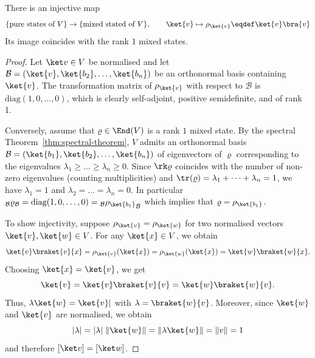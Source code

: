 \documentclass[a4paper,oneside, 12pt]{amsart}
\begin{document}
\begin{proposition}\label{prop:density-matrix-perspective}
  There is an injective map
  \begin{equation}
    \{\text{pure states of }V\}\to\{ \text{mixed stated of } V\}, \qquad \ket{v} \mapsto \rho_{\ket{v}} \eqdef \ket{v}\bra{v}
  \end{equation}
  Its image coincides with the rank \(1\) mixed states.
\end{proposition}
\begin{proof}
  Let \(\ket v \in V\) be normalised and let \( \mathcal{B} = (\ket{v}, \ket{b_2}, \dots, \ket{b_n}) \) be an orthonormal basis containing \( \ket{v} \).
  The transformation matrix of \( \rho_{\ket{v}} \) with respect to \( \mathcal{B} \) is \( \mathrm{diag}(1, 0, \dots, 0)\), which is clearly self-adjoint, positive semidefinite, and of rank 1.

  Conversely, assume that \(\varrho \in \End(V)\) is a rank \(1\) mixed state.
  By the spectral Theorem~\ref{thm:spectral-theorem}, \(V\) admits an orthonormal basis \(\mathcal{B}= (\ket{b_{1}}, \ket{b_{2}}, \dots , \ket{b_{n}})\) of eigenvectors of \(\varrho\) corresponding to the eigenvalues \(\lambda_{1}\geq  \dots \geq \lambda_{n} \geq 0\).
  Since \(\rk \varrho\) coincides with the number of non-zero eigenvalues (counting multiplicities) and \(\tr(\varrho) = \lambda_{1} + \dots + \lambda_{n} = 1\), we have \(\lambda_{1} = 1\) and \(\lambda_{2} = \dots = \lambda_{n} = 0\).
  In particular \(_{\mathcal{B}}\varrho_{\mathcal{B}} = \mathrm{diag}(1,0, \dots , 0) = {}_{\mathcal{B}}{\rho_{\ket{b_{1}}}}_{\mathcal{B}}\) which implies that \(\varrho = \rho_{\ket{b_{1}}}\).


  To show injectivity, suppose \( \rho_{\ket{v}} = \rho_{\ket{w}} \) for two normalised vectors \(\ket{v}, \ket{w} \in V\).
  For any \( \ket{x} \in V \), we obtain
  \begin{equation*}
    \ket{v} \braket{v}{x}
    = \rho_{\ket{v}}(\ket{x})
    = \rho_{\ket{w}}(\ket{x})
    = \ket{w} \braket{w}{x}.
  \end{equation*}
  Choosing \( \ket{x} = \ket{v} \), we get
  \begin{equation*}
    \ket{v} = \ket{v} \braket{v}{v} = \ket{w} \braket{w}{v}.
  \end{equation*}
  Thus,  \(\lambda \ket{w}= \ket{v}|\) with \(\lambda = \braket{w}{v}\).
  Moreover, since \(\ket{w}\) and \(\ket{v}\) are normalised, we obtain
  \begin{equation*}
    |\lambda| = |\lambda| \; \|\ket{w}\| = \|\lambda \ket{w}\| = \|v\| = 1
  \end{equation*}
  and therefore \([\ket v] = [\ket w]\).
\end{proof}
\end{document}
